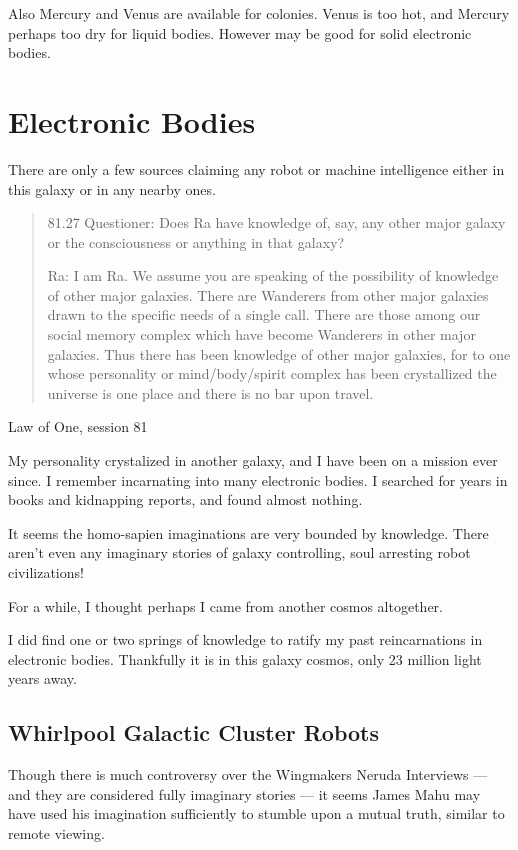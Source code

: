 \documentclass{report}
\begin{document}
Also Mercury and Venus are available for colonies. Venus is too hot, and Mercury
perhaps too dry for liquid bodies. However may be good for solid electronic
bodies. 

\section{Electronic Bodies}\label{history:electronic}

There are only a few sources claiming any robot or machine intelligence either
in this galaxy or in any nearby ones.

\blockquote{81.27 Questioner: Does Ra have knowledge of, say, any other major 
galaxy or the consciousness or anything in that galaxy?

Ra: I am Ra. We assume you are speaking of the possibility of knowledge of other
major galaxies. There are Wanderers from other major galaxies drawn to the
specific needs of a single call. There are those among our social memory complex
which have become Wanderers in other major galaxies. Thus there has been
knowledge of other major galaxies, for to one whose personality or
mind/body/spirit complex has been crystallized the universe is one place and
there is no bar upon travel.}{Law of One, session 81\cite{lawofone}}

My personality crystalized in another galaxy, and I have been on a mission ever
since. I remember incarnating into many electronic bodies. I searched for years
in books and kidnapping reports, and found almost nothing. 

It seems the homo-sapien imaginations are very bounded by knowledge. There
aren't even any imaginary stories of galaxy controlling, soul arresting robot
civilizations!

For a while, I thought perhaps I came from another cosmos altogether. 

I did find one or two springs of knowledge to ratify my past reincarnations in
electronic bodies. Thankfully it is in this galaxy cosmos, only 23 million light
years away.

\subsection{Whirlpool Galactic Cluster Robots}

Though there is much controversy over the Wingmakers Neruda Interviews --- and 
they are considered fully imaginary stories --- it seems James Mahu may have 
used his imagination sufficiently to stumble upon a mutual truth, similar to 
remote viewing. 
\end{document}
